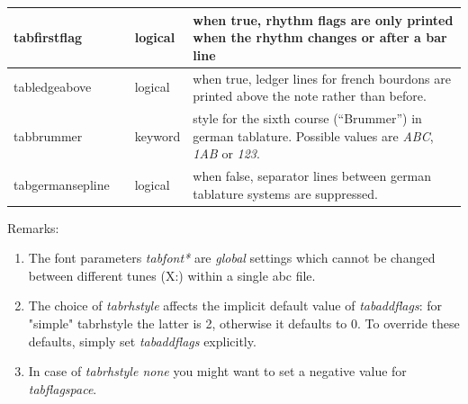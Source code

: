 \documentclass[a4paper]{article}
\begin{document}
\begin{center}
\begin{longtable}{|l|l|l|p{7.2cm}|}
tabfirstflag & & logical & when true, rhythm flags are only printed when the
    rhythm changes or after a bar line \\ \hline
tabledgeabove & & logical & when true, ledger lines for french bourdons
    are printed above the note rather than before. \\ \hline
tabbrummer & & keyword & style for the sixth course (``Brummer'') in
    german tablature. Possible values are {\it ABC}, {\it 1AB} or {\it 123}.
    \\ \hline
tabgermansepline & & logical & when false, separator lines between german
    tablature systems are suppressed. \\ \hline
\end{longtable}
\end{center}

Remarks:
\begin{enumerate}
\item The font parameters {\it tabfont*} are {\it global} settings
    which cannot be changed between different tunes (X:) within
    a single abc file.
\item The choice of {\it tabrhstyle} affects the implicit default value of
    {\it tabaddflags}: for "simple" tabrhstyle the latter is 2, otherwise
    it defaults to 0. To override these defaults, simply set {\it tabaddflags}
    explicitly.
\item In case of {\it tabrhstyle none} you might want to set a negative
    value for {\it tabflagspace}.
\end{enumerate}
\end{document}
